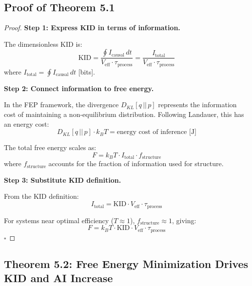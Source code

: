 \documentclass[11pt,a4paper]{article}
\begin{document}
\subsection{Proof of Theorem 5.1}

\begin{proof}
\textbf{Step 1: Express KID in terms of information.}

The dimensionless KID is:
\begin{equation}
\text{KID} = \frac{\oint I_{\text{causal}}\, dt}{V_{\text{eff}} \cdot \tau_{\text{process}}} = \frac{I_{\text{total}}}{V_{\text{eff}} \cdot \tau_{\text{process}}}
\end{equation}
where $I_{\text{total}} = \oint I_{\text{causal}}\, dt$ [bits].

\textbf{Step 2: Connect information to free energy.}

In the FEP framework, the divergence $D_{KL}[q \,||\, p]$ represents the information cost of maintaining a non-equilibrium distribution. Following Landauer, this has an energy cost:
\begin{equation}
D_{KL}[q \,||\, p] \cdot k_B T = \text{energy cost of inference [J]}
\end{equation}

The total free energy scales as:
\begin{equation}
F = k_B T \cdot I_{\text{total}} \cdot f_{\text{structure}}
\end{equation}
where $f_{\text{structure}}$ accounts for the fraction of information used for structure.

\textbf{Step 3: Substitute KID definition.}

From the KID definition:
\begin{equation}
I_{\text{total}} = \text{KID} \cdot V_{\text{eff}} \cdot \tau_{\text{process}}
\end{equation}

For systems near optimal efficiency ($T \approx 1$), $f_{\text{structure}} \approx 1$, giving:
\begin{equation}
F = k_B T \cdot \text{KID} \cdot V_{\text{eff}} \cdot \tau_{\text{process}}
\end{equation}
\hfill $\square$
\end{proof}

\subsection{Theorem 5.2: Free Energy Minimization Drives KID and AI Increase}
\end{document}
